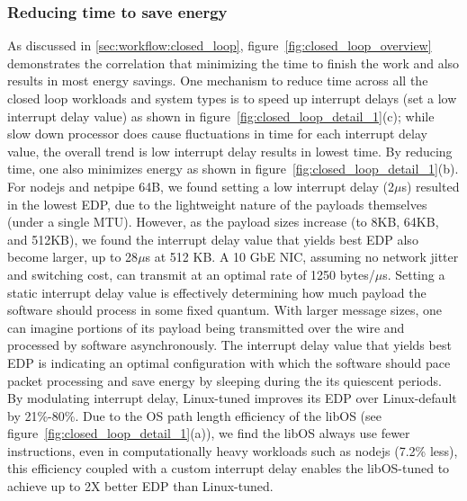 
\subsubsection{Reducing time to save energy}
\label{sec:closed_loop:speedup}
As discussed in \cref{sec:workflow:closed_loop}, figure~\ref{fig:closed_loop_overview} demonstrates the correlation that minimizing the time to finish the work and also results in most energy savings. One mechanism to reduce time across all the closed loop workloads and system types is to speed up interrupt delays (set a low interrupt delay value) as shown in figure~\ref{fig:closed_loop_detail_1}(c); while slow down processor does cause fluctuations in time for each interrupt delay value, the overall trend is low interrupt delay results in lowest time. By reducing time, one also minimizes energy as shown in figure~\ref{fig:closed_loop_detail_1}(b). For nodejs and netpipe 64B, we found setting a low interrupt delay (2$\mu$s) resulted in the lowest EDP, due to the lightweight nature of the payloads themselves (under a single MTU). However, as the payload sizes increase (to 8KB, 64KB, and 512KB), we found the interrupt delay value that yields best EDP also become larger, up to 28$\mu$s at 512 KB. A 10 GbE NIC, assuming no network jitter and switching cost, can transmit at an optimal rate of 1250 bytes/$\mu$s. Setting a static interrupt delay value is effectively determining how much payload the software should process in some fixed quantum. With larger message sizes, one can imagine portions of its payload being transmitted over the wire and processed by software asynchronously. The interrupt delay value that yields best EDP is indicating an optimal configuration with which the software should pace packet processing and save energy by sleeping during the its quiescent periods. By modulating interrupt delay, Linux-tuned improves its EDP over Linux-default by 21\%-80\%. Due to the OS path length efficiency of the libOS (see figure~\ref{fig:closed_loop_detail_1}(a)), we find the libOS always use fewer instructions, even in computationally heavy workloads such as nodejs (7.2\% less), this efficiency coupled with a custom interrupt delay enables the libOS-tuned to achieve up to 2X better EDP than Linux-tuned.


